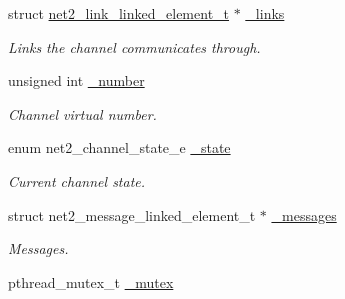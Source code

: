 \begin{DoxyCompactItemize}
\item 
\hypertarget{structnet2__channel__input__t_a361553649d82ea4d450721ba7578cf5c}{}struct \hyperlink{structnet2__link__linked__element__t}{net2\+\_\+link\+\_\+linked\+\_\+element\+\_\+t} $\ast$ \hyperlink{structnet2__channel__input__t_a361553649d82ea4d450721ba7578cf5c}{\+\_\+links}\label{structnet2__channel__input__t_a361553649d82ea4d450721ba7578cf5c}

\begin{DoxyCompactList}\small\item\em Links the channel communicates through. \end{DoxyCompactList}\item 
\hypertarget{structnet2__channel__input__t_aad432fed1cbfe759ef2d473ab8f47109}{}unsigned int \hyperlink{structnet2__channel__input__t_aad432fed1cbfe759ef2d473ab8f47109}{\+\_\+number}\label{structnet2__channel__input__t_aad432fed1cbfe759ef2d473ab8f47109}

\begin{DoxyCompactList}\small\item\em Channel virtual number. \end{DoxyCompactList}\item 
\hypertarget{structnet2__channel__input__t_a3363f7063e071be71e1320617a870b84}{}enum net2\+\_\+channel\+\_\+state\+\_\+e \hyperlink{structnet2__channel__input__t_a3363f7063e071be71e1320617a870b84}{\+\_\+state}\label{structnet2__channel__input__t_a3363f7063e071be71e1320617a870b84}

\begin{DoxyCompactList}\small\item\em Current channel state. \end{DoxyCompactList}\item 
\hypertarget{structnet2__channel__input__t_a62adebf1311e1002e0f5a67fa00ea1a0}{}struct net2\+\_\+message\+\_\+linked\+\_\+element\+\_\+t $\ast$ \hyperlink{structnet2__channel__input__t_a62adebf1311e1002e0f5a67fa00ea1a0}{\+\_\+messages}\label{structnet2__channel__input__t_a62adebf1311e1002e0f5a67fa00ea1a0}

\begin{DoxyCompactList}\small\item\em Messages. \end{DoxyCompactList}\item 
\hypertarget{structnet2__channel__input__t_a9d656c00ee2f6d89286272487bac4ec3}{}pthread\+\_\+mutex\+\_\+t \hyperlink{structnet2__channel__input__t_a9d656c00ee2f6d89286272487bac4ec3}{\+\_\+mutex}\label{structnet2__channel__input__t_a9d656c00ee2f6d89286272487bac4ec3}


\end{DoxyCompactItemize}

